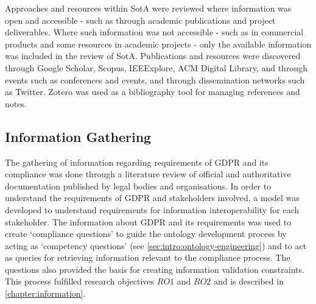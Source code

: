 Approaches and resources within SotA were reviewed where information was open and accessible - such as through academic publications and project deliverables.
Where such information was not accessible - such as in commercial products and some resources in academic projects - only the available information was included in the review of SotA.
Publications and resources were discovered through Google Scholar, Scopus, IEEExplore, ACM Digital Library, and through events such as conferences and events, and through dissemination networks such as Twitter.
Zotero was used as a bibliography tool for managing references and notes.

\subsection{Information Gathering}
The gathering of information regarding requirements of GDPR and its compliance was done through a literature review of official and authoritative documentation published by legal bodies and organisations.
In order to understand the requirements of GDPR and stakeholders involved, a model was developed to understand requirements for information interoperability for each stakeholder.
The information about GDPR and its requirements was used to create `compliance questions' to guide the ontology development process by acting as `competency questions' (see \autoref{sec:intro:ontology-engineering}) and to act as queries for retrieving information relevant to the compliance process. The questions also provided the basis for creating information validation constraints.
This process fulfilled research objectives $RO1$ and $RO2$ and is described in \autoref{chapter:information}.

